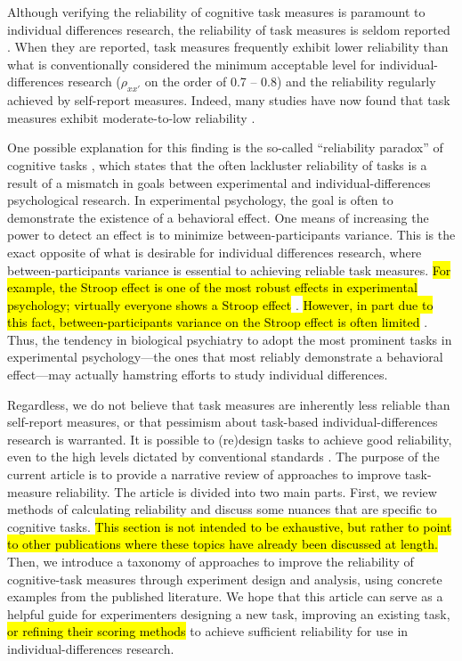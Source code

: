 \documentclass[a4paper,12pt]{article}
\begin{document}
Although verifying the reliability of cognitive task measures is paramount to individual differences research, the reliability of task measures is seldom reported \cite{Green2016-xw, Parsons2019-jw}. When they are reported, task measures frequently exhibit lower reliability than what is conventionally considered the minimum acceptable level for individual-differences research ($\rho_{xx'}$ on the order of 0.7 -- 0.8) and the reliability regularly achieved by self-report measures. Indeed, many studies have now found that task measures exhibit moderate-to-low reliability \cite{Hedge2018-lf, Frey2017-uz, Enkavi2019-oh, Von_Bastian2020-tm, Nitsch2022-pe, verdejo2021unified}.

One possible explanation for this finding is the so-called ``reliability paradox'' of cognitive tasks \cite{Hedge2018-lf}, which states that the often lackluster reliability of tasks is a result of a mismatch in goals between experimental and individual-differences psychological research. In experimental psychology, the goal is often to demonstrate the existence of a behavioral effect. One means of increasing the power to detect an effect is to minimize between-participants variance. This is the exact opposite of what is desirable for individual differences research, where between-participants variance is essential to achieving reliable task measures. \hl{For example, the Stroop effect is one of the most robust effects in experimental psychology; virtually everyone shows a Stroop effect} \cite{haaf2017developing}. \hl{However, in part due to this fact, between-participants variance on the Stroop effect is often limited} \cite{rouder2019most}. Thus, the tendency in biological psychiatry to adopt the most prominent tasks in experimental psychology---the ones that most reliably demonstrate a behavioral effect---may actually hamstring efforts to study individual differences. 

Regardless, we do not believe that task measures are inherently less reliable than self-report measures, or that pessimism about task-based individual-differences research is warranted. It is possible to (re)design tasks to achieve good reliability, even to the high levels dictated by conventional standards \cite{mclean2018towards, kucina2022solution, snijder2022psychometric, rey2019executive}. The purpose of the current article is to provide a narrative review of approaches to improve task-measure reliability. The article is divided into two main parts. First, we review methods of calculating reliability and discuss some nuances that are specific to cognitive tasks. \hl{This section is not intended to be exhaustive, but rather to point to other publications where these topics have already been discussed at length.} Then, we introduce a taxonomy of approaches to improve the reliability of cognitive-task measures through experiment design and analysis, using concrete examples from the published literature. We hope that this article can serve as a helpful guide for experimenters designing a new task, improving an existing task, \hl{or refining their scoring methods} to achieve sufficient reliability for use in individual-differences research.
\end{document}
